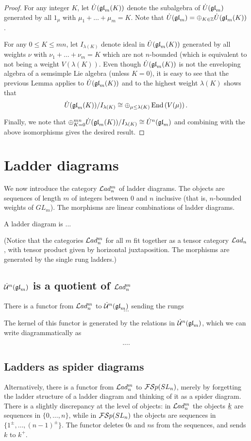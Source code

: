 \documentclass[10pt,leqno]{article}
\begin{document}
\begin{proof}
For any integer $K$, let $\dot{U}({\mathfrak{gl}}_m(K))$ denote the subalgebra of $\dot{U}({\mathfrak{gl}}_m)$ generated by all $ 1_\mu $ with $ \mu_1 + \dots + \mu_m = K $.  Note that $\dot{U}({\mathfrak{gl}}_m) = \oplus_{K \in \mathbb Z} \dot{U}({\mathfrak{gl}}_m(K))$. 

For any $ 0 \le K \le mn $, let $ I_{\lambda(K)} $ denote ideal in $\dot{U}({\mathfrak{gl}}_m(K))$ generated by all weights $ \nu $ with $ \nu_1 + \dots + \nu_m = K $ which are not $ n$-bounded (which is equivalent to not being a weight $ V(\lambda(K)) $. Even though ${\dot U}({\mathfrak{gl}}_m(K))$ is not the enveloping algebra of a semsimple Lie algebra (unless $ K = 0 $), it is easy to see that the previous Lemma applies to ${\dot{U}}({\mathfrak{gl}}_m(K))$ and to the highest weight $\lambda(K)$ shows that
$${\dot U}({\mathfrak{gl}}_m(K)) / I_{\lambda(K)} \cong \oplus_{\mu \le \lambda(K)} \operatorname{End}\left(V(\mu)\right).$$

Finally, we note that $\oplus_{K=0}^{mn} {\dot{U}}({\mathfrak{gl}}_m(K)) / I_{\lambda(K)} \cong \dot{U}^n({\mathfrak{gl}}_m)$ and combining with the above isomorphisms gives the desired result.
\end{proof} 

\section{Ladder diagrams}
\label{sec:ladders}
We now introduce the category   $ \mathcal{L}ad_n^m $ of ladder diagrams. The objects are sequences of length $m$ of integers between $0$ and $n$ inclusive (that is, $n$-bounded weights of $GL_m$). The morphisms are linear combinations of ladder diagrams.

\begin{defn}
A ladder diagram is ...
\end{defn}

(Notice that the categories $\mathcal{L}ad_n^m$ for all $m$ fit together as a tensor category $\mathcal{L}ad_n$, with tensor product given by horizontal juxtaposition. The morphisms are generated by the single rung ladders.)

\subsection{$\dot{{\mathcal{U}}}^n({\mathfrak{gl}}_m)$ is a quotient of $\mathcal{L}ad_n^m$}
There is a functor from $\mathcal{L}ad_n^m$ to $\dot{{\mathcal{U}}}^n({\mathfrak{gl}}_m)$ sending the rungs
$$...$$

The kernel of this functor is generated by the relations in $\dot{{\mathcal{U}}}^n({\mathfrak{gl}}_m)$, which we can write diagrammatically as

$$....$$

\subsection{Ladders as spider diagrams}\label{sec:psi}
Alternatively, there is a functor from $\mathcal{L}ad_n^m$ to ${\mathcal{FS}p}(SL_n)$, merely by forgetting the ladder structure of a ladder diagram and thinking of it as a spider diagram. There is a slightly discrepancy at the level of objects: in $\mathcal{L}ad_n^m$ the objects ${\underline{k}}$ are sequences in $\{0,\ldots,n\}$, while in ${\mathcal{FS}p}(SL_n)$ the objects are sequences in $\{1^\pm,\ldots,(n-1)^\pm\}$. The functor deletes $0$s and $n$s from the sequences, and sends $k$ to $k^+$.
\end{document}
